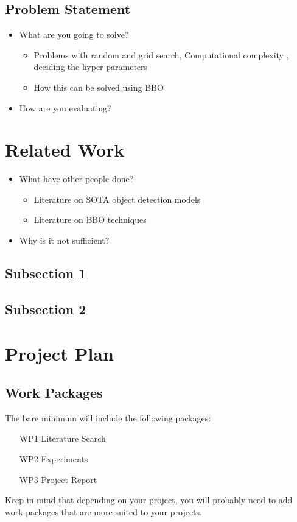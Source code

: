 \documentclass[thesis]{mas_proposal}
\begin{document}
\subsection{Problem Statement}
\begin{itemize}
    \item What are you going to solve?
    \begin{itemize}
        \item Problems with random and grid search, Computational complexity , deciding the hyper parameters
        \item How this can be solved using BBO
    \end{itemize}
    \item How are you evaluating?
\end{itemize}


\section{Related Work}
\begin{itemize}
    \item What have other people done?
    \begin{itemize}
        \item Literature on SOTA object detection models
        \item Literature on BBO techniques
    \end{itemize}
    \item Why is it not sufficient?
\end{itemize}

\subsection{Subsection 1}
\subsection{Subsection 2}



\section{Project Plan}

\subsection{Work Packages}
The bare minimum will include the following packages:
\begin{enumerate}
    \item[WP1] Literature Search
    \item[WP2] Experiments
    \item[WP3] Project Report
\end{enumerate}
Keep in mind that depending on your project, you will probably need to add work packages that are more suited to your projects.
\end{document}
